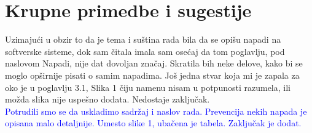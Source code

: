 \documentclass[a4paper]{report}
\newcommand{\odgovor}[1]{\textcolor{blue}{#1}}
\begin{document}
\section{Krupne primedbe i sugestije}
Uzimajući u obzir to da je tema i suština rada bila da se opišu napadi na softverske sisteme, dok sam čitala imala sam osećaj da tom poglavlju, pod naslovom Napadi, nije dat dovoljan značaj. Skratila bih neke delove, kako bi se moglo opširnije pisati o samim napadima. Još jedna stvar koja mi je zapala za oko je u poglavlju 3.1, Slika 1 čiju namenu nisam u potpunosti razumela, ili možda slika nije uspešno dodata. Nedostaje zaključak.\\
\odgovor{Potrudili smo se da uskladimo sadržaj i naslov rada. Prevencija nekih napada je opisana malo detaljnije. Umesto slike 1, ubačena je tabela. Zaključak je dodat.}
\end{document}
